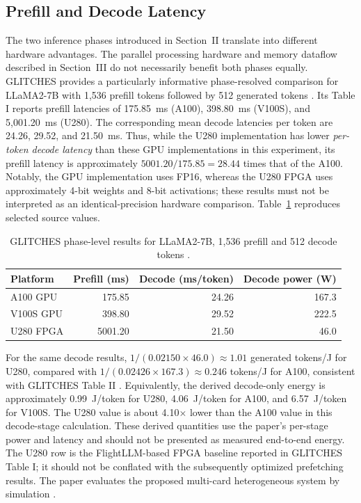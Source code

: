 \subsection{Prefill and Decode Latency}
The two inference phases introduced in Section~II translate into different hardware advantages. The parallel processing hardware and memory dataflow described in Section~III do not necessarily benefit both phases equally. GLITCHES provides a particularly informative phase-resolved comparison for LLaMA2-7B with 1,536 prefill tokens followed by 512 generated tokens \cite{yang2024glitches}. Its Table I reports prefill latencies of 175.85~ms (A100), 398.80~ms (V100S), and 5,001.20~ms (U280). The corresponding mean decode latencies per token are 24.26, 29.52, and 21.50~ms. Thus, while the U280 implementation has lower \emph{per-token decode latency} than these GPU implementations in this experiment, its prefill latency is approximately $5001.20/175.85=28.44$ times that of the A100. Notably, the GPU implementation uses FP16, whereas the U280 FPGA uses approximately 4-bit weights and 8-bit activations; these results must not be interpreted as an identical-precision hardware comparison. Table~\ref{tab:glitches} reproduces selected source values.

\begin{table}[t]
\caption{GLITCHES phase-level results for LLaMA2-7B, 1,536 prefill and 512 decode tokens \cite{yang2024glitches}.}
\label{tab:glitches}
\centering\footnotesize
\begin{tabular}{lrrr}
\hline
Platform & Prefill (ms) & Decode (ms/token) & Decode power (W)\\ \hline
A100 GPU & 175.85 & 24.26 & 167.3\\
V100S GPU & 398.80 & 29.52 & 222.5\\
U280 FPGA & 5001.20 & 21.50 & 46.0\\ \hline
\end{tabular}
\end{table}

For the same decode results, $1/(0.02150\times46.0)\approx1.01$ generated tokens/J for U280, compared with $1/(0.02426\times167.3)\approx0.246$ tokens/J for A100, consistent with GLITCHES Table II \cite{yang2024glitches}. Equivalently, the derived decode-only energy is approximately 0.99~J/token for U280, 4.06~J/token for A100, and 6.57~J/token for V100S. The U280 value is about 4.10$\times$ lower than the A100 value in this decode-stage calculation. These derived quantities use the paper's per-stage power and latency and should not be presented as measured end-to-end energy. The U280 row is the FlightLLM-based FPGA baseline reported in GLITCHES Table I; it should not be conflated with the subsequently optimized prefetching results. The paper evaluates the proposed multi-card heterogeneous system by simulation \cite{yang2024glitches}.

